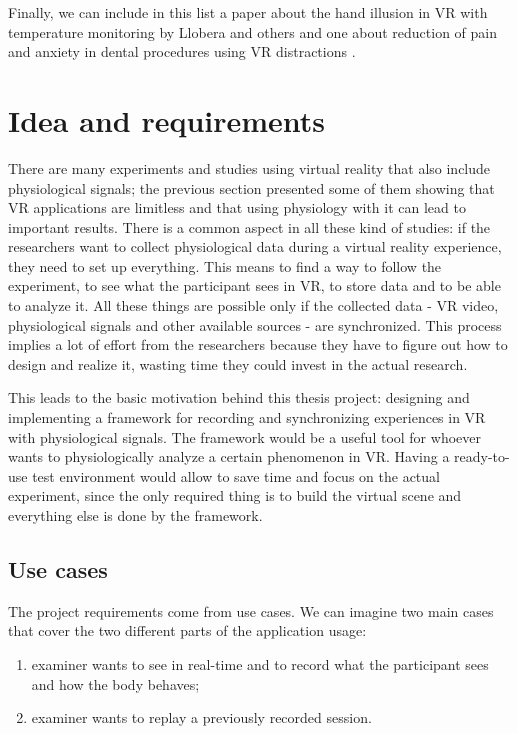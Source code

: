 \documentclass[binding=0.6cm,LaM]{sapthesis}
\begin{document}
Finally, we can include in this list a paper about the hand illusion in VR with temperature monitoring by Llobera and others \cite{llobera2013relationship} and one about reduction of pain and anxiety in dental procedures using VR distractions \cite{wiederhold2014clinical}.

\section{Idea and requirements}
There are many experiments and studies using virtual reality that also include physiological signals; the previous section presented some of them showing that VR applications are limitless and that using physiology with it can lead to important results.
There is a common aspect in all these kind of studies: if the researchers want to collect physiological data during a virtual reality experience, they need to set up everything. This means to find a way to follow the experiment, to see what the participant sees in VR, to store data and to be able to analyze it. All these things are possible only if the collected data - VR video, physiological signals and other available sources - are synchronized. This process implies a lot of effort from the researchers because they have to figure out how to design and realize it, wasting time they could invest in the actual research.

This leads to the basic motivation behind this thesis project: designing and implementing a framework for recording and synchronizing experiences in VR with physiological signals. The framework would be a useful tool for whoever wants to physiologically analyze a certain phenomenon in VR. Having a ready-to-use test environment would allow to save time and focus on the actual experiment, since the only required thing is to build the virtual scene and everything else is done by the framework.

\subsection{Use cases}
The project requirements come from use cases. We can imagine two main cases that cover the two different parts of the application usage:

\begin{enumerate}

\item examiner wants to see in real-time and to record what the participant sees and how the body behaves;

\item examiner wants to replay a previously recorded session.

\end{enumerate}
\end{document}
